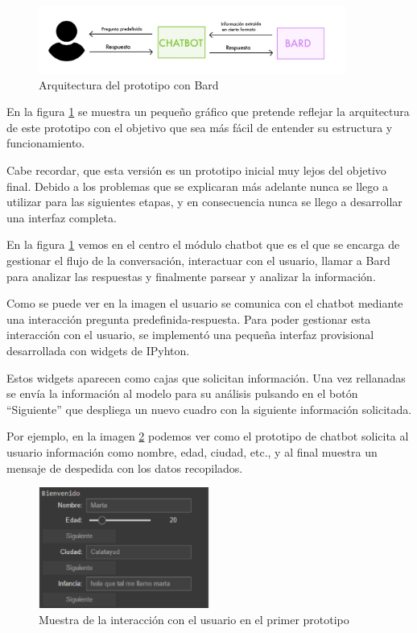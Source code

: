 \begin{figure}[b]
	\centering
	\includegraphics[width=0.9\textwidth]{Imagenes/arquitecturabard}
	\caption{Arquitectura del prototipo con Bard}
	\label{fig:arquitecturabard}
\end{figure}

En la figura \ref{fig:arquitecturabard} se muestra un pequeño gráfico que pretende reflejar la arquitectura de este prototipo con el objetivo que sea más fácil de entender su estructura y funcionamiento.

Cabe recordar, que esta versión es un prototipo inicial muy lejos del objetivo final. Debido a los problemas que se explicaran más adelante nunca se llego a utilizar para las siguientes etapas, y en consecuencia nunca se llego a desarrollar una interfaz completa. 

En la figura \ref{fig:arquitecturabard} vemos en el centro el módulo chatbot que es el que se encarga de gestionar el flujo de la conversación, interactuar con el usuario, llamar a Bard para analizar las respuestas y finalmente parsear y analizar la información. 

Como se puede ver en la imagen el usuario se comunica con el chatbot mediante una interacción pregunta predefinida-respuesta. Para poder gestionar esta interacción con el usuario, se implementó una pequeña interfaz provisional desarrollada con widgets de IPyhton. 

Estos widgets aparecen como cajas que solicitan información. Una vez rellanadas se envía la información al modelo para su análisis pulsando en el botón ``Siguiente'' que despliega un nuevo cuadro con la siguiente información solicitada. 

Por ejemplo, en la imagen \ref{fig:interfazPrototipo1} podemos ver como el prototipo de chatbot solicita al usuario información como nombre, edad, ciudad, etc., y al final muestra un mensaje de despedida con los datos recopilados. 
\begin{figure}[h]
	\centering
	\includegraphics[width=0.5\textwidth]{Imagenes/Iwidget}
	\caption{Muestra de la interacción  con el usuario en el primer prototipo}
	\label{fig:interfazPrototipo1}
\end{figure}


